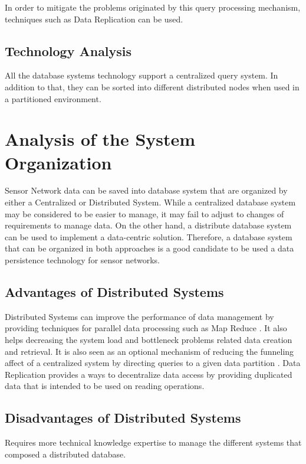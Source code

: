 In order to mitigate the problems originated by this query processing
mechanism, techniques such as Data Replication can be used.

\subsection{Technology Analysis}

All the database systems technology support a centralized query system. In
addition to that, they can be sorted into different distributed nodes when
used in a partitioned environment.

\section{Analysis of the System Organization}

Sensor Network data can be saved into database system that are organized
by either a Centralized or Distributed System. While a centralized database
system may be considered to be easier to manage, it may fail to adjust to
changes of requirements to manage data. On the other hand, a distribute
database system can be used to implement a data-centric solution. Therefore, a
database system that can be organized in both approaches is a good candidate to
be used a data persistence technology for sensor networks.

\subsection{Advantages of Distributed Systems}

Distributed Systems can improve the performance of data management by providing
techniques for parallel data processing such as Map Reduce \cite{map-reduce,
bigtable}. It also helps decreasing the system load and bottleneck problems
related data creation and retrieval. It is also seen as an optional mechanism
of reducing the funneling affect of a centralized system by directing queries
to a given data partition \cite{sn-storage04}. Data Replication
\cite{data-replication} provides a ways to decentralize data access by
providing duplicated data that is intended to be used on reading operations.

\subsection{Disadvantages of Distributed Systems}

Requires more technical knowledge expertise to manage the different systems
that composed a distributed database.

